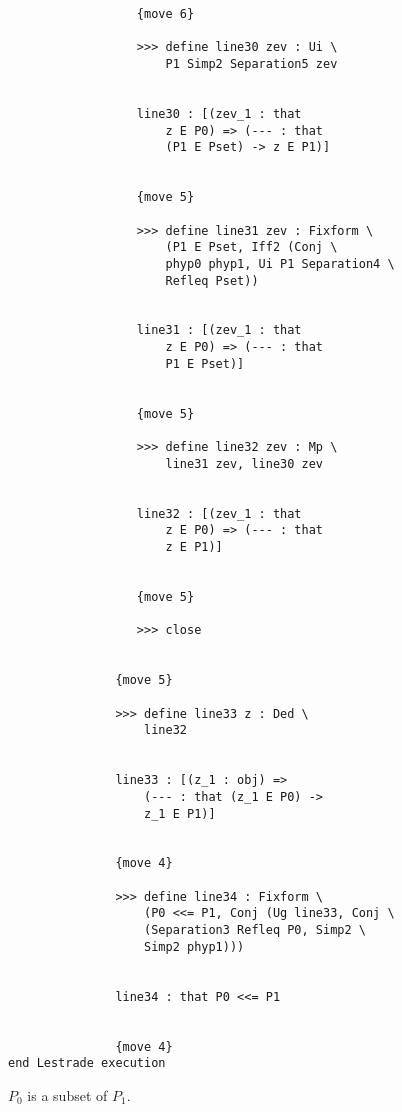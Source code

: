 \documentclass[12pt]{article}
\begin{document}
\begin{verbatim}
                  {move 6}

                  >>> define line30 zev : Ui \
                      P1 Simp2 Separation5 zev


                  line30 : [(zev_1 : that 
                      z E P0) => (--- : that 
                      (P1 E Pset) -> z E P1)]


                  {move 5}

                  >>> define line31 zev : Fixform \
                      (P1 E Pset, Iff2 (Conj \
                      phyp0 phyp1, Ui P1 Separation4 \
                      Refleq Pset))


                  line31 : [(zev_1 : that 
                      z E P0) => (--- : that 
                      P1 E Pset)]


                  {move 5}

                  >>> define line32 zev : Mp \
                      line31 zev, line30 zev


                  line32 : [(zev_1 : that 
                      z E P0) => (--- : that 
                      z E P1)]


                  {move 5}

                  >>> close


               {move 5}

               >>> define line33 z : Ded \
                   line32


               line33 : [(z_1 : obj) => 
                   (--- : that (z_1 E P0) -> 
                   z_1 E P1)]


               {move 4}

               >>> define line34 : Fixform \
                   (P0 <<= P1, Conj (Ug line33, Conj \
                   (Separation3 Refleq P0, Simp2 \
                   Simp2 phyp1)))


               line34 : that P0 <<= P1


               {move 4}
end Lestrade execution
\end{verbatim}

$P_0$ is a subset of $P_1$.
\end{document}
